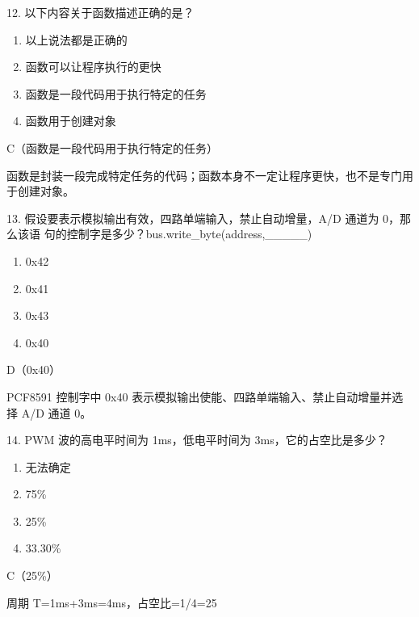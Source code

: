 \begin{question}{12. 以下内容关于函数描述正确的是？}
\begin{enumerate}[label=\Alph*., leftmargin=2.4em, itemsep=0.2em]
\item 以上说法都是正确的
\item 函数可以让程序执行的更快
\item 函数是一段代码用于执行特定的任务
\item 函数用于创建对象
\end{enumerate}
\end{question}
\begin{answer}
C（函数是一段代码用于执行特定的任务）
\end{answer}
\begin{explanation}
函数是封装一段完成特定任务的代码；函数本身不一定让程序更快，也不是专门用于创建对象。
\end{explanation}

\begin{question}{13. 假设要表示模拟输出有效，四路单端输入，禁止自动增量，A/D 通道为 0，那么该语 句的控制字是多少？bus.write\_byte(address,\_\_\_\_\_)}
\begin{enumerate}[label=\Alph*., leftmargin=2.4em, itemsep=0.2em]
\item 0x42
\item 0x41
\item 0x43
\item 0x40
\end{enumerate}
\end{question}
\begin{answer}
D（0x40）
\end{answer}
\begin{explanation}
PCF8591 控制字中 0x40 表示模拟输出使能、四路单端输入、禁止自动增量并选择 A/D 通道 0。
\end{explanation}

\begin{question}{14. PWM 波的高电平时间为 1ms，低电平时间为 3ms，它的占空比是多少？}
\begin{enumerate}[label=\Alph*., leftmargin=2.4em, itemsep=0.2em]
\item 无法确定
\item 75\%
\item 25\%
\item 33.30\%
\end{enumerate}
\end{question}
\begin{answer}
C（25\%）
\end{answer}
\begin{explanation}
周期 T=1ms+3ms=4ms，占空比=1/4=25%
\end{explanation}


